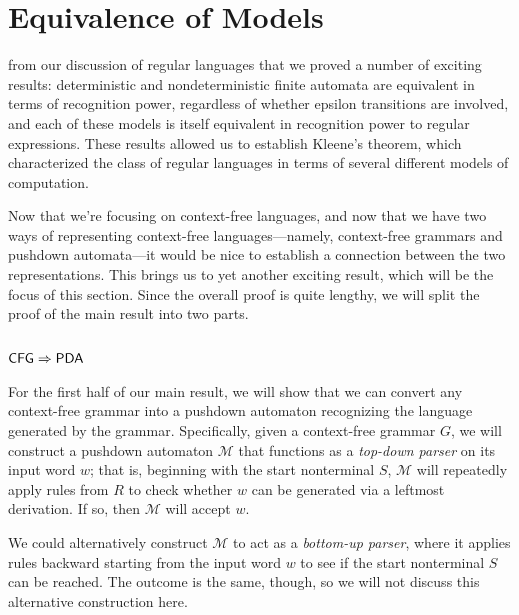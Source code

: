 \section{Equivalence of Models}\label{sec:equivalenceofmodelscontextfree}

 from our discussion of regular languages that we proved a number of exciting results: deterministic and nondeterministic finite automata are equivalent in terms of recognition power, regardless of whether epsilon transitions are involved, and each of these models is itself equivalent in recognition power to regular expressions. These results allowed us to establish Kleene's theorem, which characterized the class of regular languages in terms of several different models of computation.

Now that we're focusing on context-free languages, and now that we have two ways of representing context-free languages---namely, context-free grammars and pushdown automata---it would be nice to establish a connection between the two representations. This brings us to yet another exciting result, which will be the focus of this section. Since the overall proof is quite lengthy, we will split the proof of the main result into two parts.

\subsection{$\textsf{CFG} \Rightarrow \textsf{PDA}$}

For the first half of our main result, we will show that we can convert any context-free grammar into a pushdown automaton recognizing the language generated by the grammar. Specifically, given a context-free grammar $G$, we will construct a pushdown automaton $\mathcal{M}$ that functions as a \emph{top-down parser} on its input word $w$; that is, beginning with the start nonterminal $S$, $\mathcal{M}$ will repeatedly apply rules from $R$ to check whether $w$ can be generated via a leftmost derivation. If so, then $\mathcal{M}$ will accept $w$.

\begin{remark}
We could alternatively construct $\mathcal{M}$ to act as a \emph{bottom-up parser}, where it applies rules backward starting from the input word $w$ to see if the start nonterminal $S$ can be reached. The outcome is the same, though, so we will not discuss this alternative construction here.
\end{remark}

